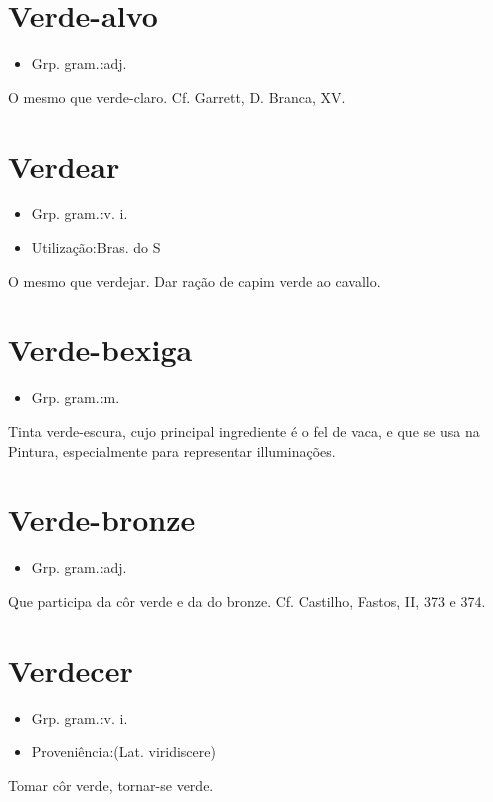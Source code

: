 \documentclass{article}
\begin{document}
\section{Verde-alvo}
\begin{itemize}
\item {Grp. gram.:adj.}
\end{itemize}
O mesmo que \textunderscore verde-claro\textunderscore . Cf. Garrett, \textunderscore D. Branca\textunderscore , XV.
\section{Verdear}
\begin{itemize}
\item {Grp. gram.:v. i.}
\end{itemize}
\begin{itemize}
\item {Utilização:Bras. do S}
\end{itemize}
O mesmo que \textunderscore verdejar\textunderscore .
Dar ração de capim verde ao cavallo.
\section{Verde-bexiga}
\begin{itemize}
\item {Grp. gram.:m.}
\end{itemize}
Tinta verde-escura, cujo principal ingrediente é o fel de vaca, e que se usa na Pintura, especialmente para representar illuminações.
\section{Verde-bronze}
\begin{itemize}
\item {Grp. gram.:adj.}
\end{itemize}
Que participa da côr verde e da do bronze. Cf. Castilho, \textunderscore Fastos\textunderscore , II, 373 e 374.
\section{Verdecer}
\begin{itemize}
\item {Grp. gram.:v. i.}
\end{itemize}
\begin{itemize}
\item {Proveniência:(Lat. \textunderscore viridiscere\textunderscore )}
\end{itemize}
Tomar côr verde, tornar-se verde.
\end{document}
